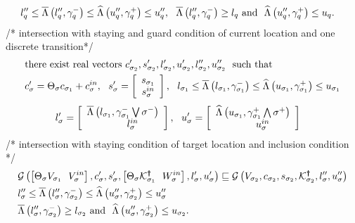 \begin{lemma}
\begin{align}
\begin{split}
&l^{\prime\prime}_q\leq\overline{\Lambda}\left(l^{\prime\prime}_q,\gamma^-_q\right)\leq\widehat{\Lambda}\left(u^{\prime\prime}_q,\gamma^+_q\right)\leq u^{\prime\prime}_q,~~ \overline{\Lambda}\left(l^{\prime\prime}_q,\gamma^-_q\right)\geq l_q~\text{and}~~
\widehat{\Lambda}\left(u^{\prime\prime}_q,\gamma^+_q\right)\leq u_q.
\end{split}
 \end{align}
/* intersection with staying and guard condition of current location
and one discrete transition*/
\vspace{-0.9em}
\begin{align}
\begin{split}
& \text{there exist real
    vectors}~c^\prime_{\sigma_{2}},s^\prime_{\sigma_{2}},l^\prime_{\sigma_{2}},u^\prime_{\sigma_{2}},l^{\prime\prime}_{\sigma_{2}},u^{\prime\prime}_{\sigma_{2}}~~\text{such
  that}\\
& c^\prime_\sigma = \Theta_\sigma c_{\sigma_{1}}+c^{in}_\sigma,~~s^\prime_\sigma =
  \left[\begin{array}{c}{s_{\sigma_{1}}}\\{s^{in}_\sigma} \end{array}\right],~~l_{\sigma_{1}}\leq\overline{\Lambda}\left(l_{\sigma_{1}},\gamma^-_{\sigma_{1}}\right)\leq\widehat{\Lambda}\left(u_{\sigma_{1}},\gamma^+_{\sigma_{1}}\right)\leq u_{\sigma_{1}}
\end{split}
\end{align}
\vspace{-1.5em}
\begin{align}
& l^\prime_\sigma =
  \left[\begin{array}{c}{\overline{\Lambda}\left(l_{\sigma_{1}},\gamma^-_{\sigma_{1}}\bigvee\sigma^-\right)}\\{~~~~~~~~~l^{in}_{\sigma}~~~} \end{array}\right],~~u^\prime_\sigma =
  \left[\begin{array}{c}{\widehat{\Lambda}\left(u_{\sigma_{1}},\gamma^+_{\sigma_{1}}\bigwedge\sigma^+\right)}\\{~~~~~~~~~u^{in}_\sigma~~~} \end{array}\right]
\end{align}
/*  intersection with staying condition of target location and inclusion condition */
\begin{align}
& \mathcal{G}\left(\left[\Theta_\sigma V_{\sigma_{1}}~~V^{in}_{\sigma}\right],c^\prime_\sigma,s^\prime_\sigma,\left[\Theta_\sigma\mathcal{K}^{\bm{\dagger}}_{\sigma_{1}}~~W^{in}_\sigma\right],l^\prime_\sigma,u^\prime_\sigma\right)
 \sqsubseteq
   \mathcal{G}\left(V_{\sigma_{2}},c_{\sigma_{2}},s_{\sigma_{2}},\mathcal{K}^{\bm{\dagger}}_{\sigma_{2}},l^{\prime\prime}_\sigma,u^{\prime\prime}_\sigma\right) \nonumber \\
& l^{\prime\prime}_\sigma\leq\overline{\Lambda}\left(l^{\prime\prime}_\sigma,\gamma^-_{\sigma_{2}}\right)\leq\widehat{\Lambda}\left(u^{\prime\prime}_\sigma,\gamma^+_{\sigma_{2}}\right)\leq u^{\prime\prime}_\sigma\nonumber\\
& \overline{\Lambda}\left(l^{\prime\prime}_\sigma,\gamma^-_{\sigma_{2}}\right)\geq l_{\sigma_{2}}~\text{and}~~
\widehat{\Lambda}\left(u^{\prime\prime}_\sigma,\gamma^+_{\sigma_{2}}\right)\leq u_{\sigma_{2}}.
\end{align}
\vspace{-1.5em}
\end{lemma}
